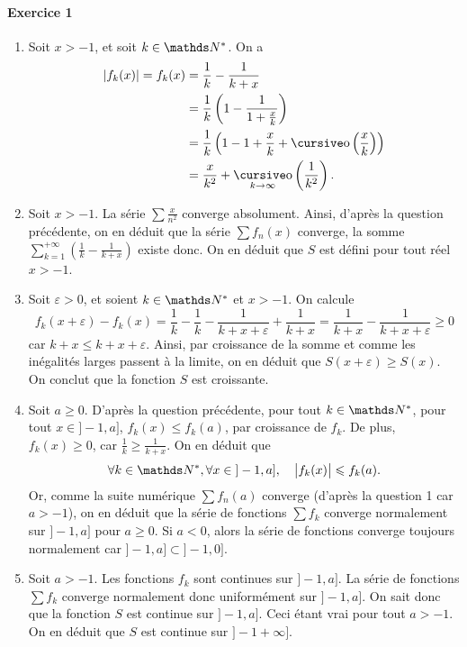 \documentclass[a4paper,9pt]{article}
\begin{document}
	\paragraph{Exercice 1}
	\begin{enumerate}
		\item Soit $x > -1$, et soit $k \in \N^*$. On a
			\begin{align*}
				|f_k(x)| = f_k(x) &= \frac{1}{k} - \frac{1}{k+x} \\
				&= \frac{1}{k}\left( 1 - \frac{1}{1+\frac{x}{k}} \right) \\
				&= \frac{1}{k}\left( 1 - 1 + \frac{x}{k} + \po\left( \frac{x}{k} \right) \right) \\
				&= \frac{x}{k^2} + \po_{k\to \infty}\left(\frac{1}{k^2}\right).
			\end{align*}
		\item Soit $x > -1$. La série $\sum \frac{x}{n^2}$\/ converge absolument. Ainsi, d'après la question précédente, on en déduit que la série $\sum f_n(x)$\/ converge, la somme $\sum_{k=1}^{+\infty} \left( \frac{1}{k} - \frac{1}{k+x} \right)$\/ existe donc. On en déduit que $S$\/ est défini pour tout réel $x > -1$.
		\item Soit $\varepsilon > 0$, et soient $k \in \N^*$\/ et $x > -1$. On calcule \[
				f_k(x + \varepsilon) - f_k(x) = \frac{1}{k} - \frac{1}{k} - \frac{1}{k + x + \varepsilon} + \frac{1}{k + x} = \frac{1}{k+x} - \frac{1}{k+x+\varepsilon} \ge 0
			\] car $k + x \le k + x + \varepsilon$. Ainsi, par croissance de la somme et comme les inégalités larges passent à la limite, on en déduit que $S(x+ \varepsilon) \ge S(x)$. On conclut que la fonction $S$\/ est croissante.
		\item Soit $a \ge 0$. D'après la question précédente, pour tout $k \in \N^*$, pour tout $x \in {]-1,a]}$, $f_k(x) \le f_k(a)$, par croissance de $f_k$. De plus, $f_k(x) \ge 0$, car $\frac{1}{k} \ge \frac{1}{k+x}$. On en déduit que \[
				\forall k \in \N^*,\forall x \in {]-1,a]},\quad \big|f_k(x)\big| \le f_k(a)
			.\] Or, comme la suite numérique $\sum f_n(a)$\/ converge (d'après la question 1 car $a > -1$), on en déduit que la série de fonctions $\sum f_k$\/ converge normalement sur $]-1,a]$\/ pour $a \ge  0$. Si $a < 0$, alors la série de fonctions converge toujours normalement car $]-1,a] \subset {]-1,0]}$.
		\item Soit $a > -1$. Les fonctions $f_k$\/ sont continues sur $]-1,a]$. La série de fonctions $\sum f_k$\/ converge normalement donc uniformément sur $]-1,a]$. On sait donc que la fonction $S$\/ est continue sur $]-1,a]$. Ceci étant vrai pour tout $a > -1$. On en déduit que $S$\/ est continue sur $]-1+\infty]$.

\end{enumerate}
\end{document}
